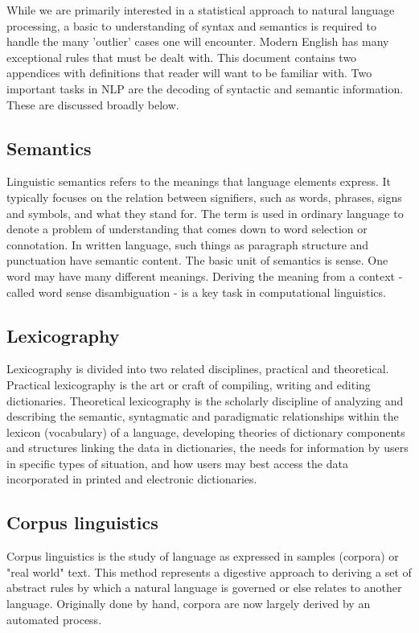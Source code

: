 While we are primarily interested in a statistical approach to natural language processing, a basic to understanding of syntax and semantics is required to handle the many 'outlier' cases one will encounter.  Modern English has many exceptional rules that must be dealt with.  This document contains two appendices with definitions that reader will want to be familiar with.  Two important tasks in NLP are the decoding of syntactic and semantic information.  These are discussed broadly below.

\subsection{Semantics}
Linguistic semantics refers to the meanings that language elements express.  It typically focuses on the relation between signifiers, such as words, phrases, signs and symbols, and what they stand for.  The term is used in ordinary language to denote a problem of understanding that comes down to word selection or connotation. In written language, such things as paragraph structure and punctuation have semantic content.  The basic unit of semantics is sense.  One word may have many different meanings.  Deriving the meaning from a context - called word sense disambiguation - is a key task in computational linguistics.

\subsection{Lexicography}Lexicography is divided into two related disciplines, practical and theoretical.  Practical lexicography is the art or craft of compiling, writing and editing dictionaries.  Theoretical lexicography is the scholarly discipline of analyzing and describing the semantic, syntagmatic and paradigmatic relationships within the lexicon (vocabulary) of a language, developing theories of dictionary components and structures linking the data in dictionaries, the needs for information by users in specific types of situation, and how users may best access the data incorporated in printed and electronic dictionaries.

\subsection{Corpus linguistics} Corpus linguistics is the study of language as expressed in samples (corpora) or "real world" text. This method represents a digestive approach to deriving a set of abstract rules by which a natural language is governed or else relates to another language. Originally done by hand, corpora are now largely derived by an automated process.



